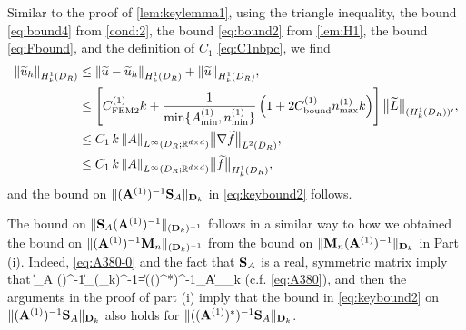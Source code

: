 Similar to the proof of \cref{lem:keylemma1},
using the triangle inequality, the bound \cref{eq:bound4} from \cref{cond:2}, the bound \cref{eq:bound2} from \cref{lem:H1}, the bound \cref{eq:Fbound}, and the definition of $C_1$ \cref{eq:C1nbpc},
we find
\begin{align}\nonumber 
\N{\tu_h}_{\HokDR} &\leq
\N{\tu-\tu_h}_{\HokDR} + \N{\tu}_{\HokDR},\nonumber \\ \nonumber
& \leq \left[ C^{(1)}_{\rm FEM2} k + 
\frac{1}{\min\{\Asomin,\nsomin\}}\left( 1 + 2 C^{(1)}_{\rm bound}\nsomax k  \right) 
\right]\big\|\widetilde{\LE}\big\|_{(\HokDR)'},\\
&\leq C_1 \, k\, 
\NLiDRRRdtd{A} \big\|\nabla\widetilde{f}\big\|_{\LtDR},\label{eq:mainevent2}\\
&\leq C_1 \, k\, 
\NLiDRRRdtd{A} \big\|\widetilde{f}\big\|_{\HokDR},\nonumber
\end{align}
and the bound on $\|(\mathbf{A}^{(1)})^{-1}\mathbf{S}_A\|_{\mathbf{D}_k}$ in \cref{eq:keybound2} follows.

The bound on $\|\mathbf{S}_A(\mathbf{A}^{(1)})^{-1}\|_{(\mathbf{D}_k)^{-1}}$ follows in a similar way to how we obtained the 
bound on  $\|(\mathbf{A}^{(1)})^{-1}\mathbf{M}_n\|_{(\mathbf{D}_k)^{-1}}$ from the bound on $\|\mathbf{M}_n(\mathbf{A}^{(1)})^{-1}\|_{\mathbf{D}_k}$ in Part (i). Indeed, 
\cref{eq:A380-0} and the fact that $\mathbf{S}_A$ is a real, symmetric matrix imply that 
\beq\label{eq:A380-2} 
 \big\|\Smat_A (\Amato)^{-1}\big\|_{(\Dmat_k)^{-1}}=\big\|\big((\Amato)^*\big)^{-1}\Smat_A\big\|_{\Dmat_k}
 \eeq 
(c.f. \cref{eq:A380}),
and then the arguments in the proof of part (i) imply that 
the bound in \cref{eq:keybound2} on $\|(\mathbf{A}^{(1)})^{-1}\mathbf{S}_A\|_{\mathbf{D}_k}$ also holds for $\|((\mathbf{A}^{(1)})^*)^{-1}\mathbf{S}_A\|_{\mathbf{D}_k}$.

